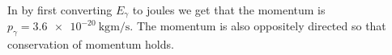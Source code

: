 In  by first converting $E_\gamma$ to joules we get that the momentum is $p_\gamma = \SI{3.6e-20}{\kg\m\per\s}$. The momentum is also oppositely directed so that conservation of momentum holds.